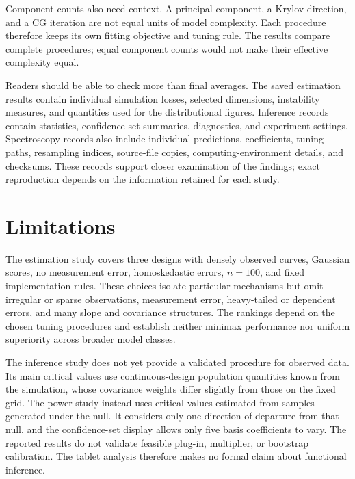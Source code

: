 Component counts also need context.  A principal component, a Krylov direction,
and a CG iteration are not equal units of model complexity.  Each procedure
therefore keeps its own fitting objective and tuning rule.  The results
compare complete procedures; equal component counts would not make their
effective complexity equal.

Readers should be able to check more than final averages.  The saved
estimation results contain individual simulation losses, selected dimensions,
instability measures, and quantities used for the distributional figures.
Inference records contain statistics, confidence-set summaries, diagnostics,
and experiment settings.  Spectroscopy records also include individual
predictions, coefficients, tuning paths, resampling indices, source-file
copies, computing-environment details, and checksums.  These records support
closer examination of the findings; exact reproduction depends on the
information retained for each study.

\section{Limitations}
\label{sec:conclusion-limitations}

The estimation study covers three designs with densely observed curves,
Gaussian scores, no measurement error, homoskedastic errors, $n=100$, and fixed
implementation rules.  These choices isolate particular mechanisms but omit
irregular or sparse observations, measurement error, heavy-tailed or dependent
errors, and many slope and covariance structures.  The rankings depend on the
chosen tuning procedures and establish neither minimax performance nor
uniform superiority across broader model classes.

The inference study does not yet provide a validated procedure for observed
data.  Its main critical values use continuous-design population quantities
known from the simulation, whose covariance weights differ slightly from
those on the fixed grid.  The power study instead uses critical values
estimated from samples generated under the null.  It considers only one
direction of departure from that null, and the confidence-set display allows
only five basis coefficients to vary.  The reported results do not validate
feasible plug-in, multiplier, or bootstrap calibration.  The tablet analysis
therefore makes no formal claim about functional inference.

